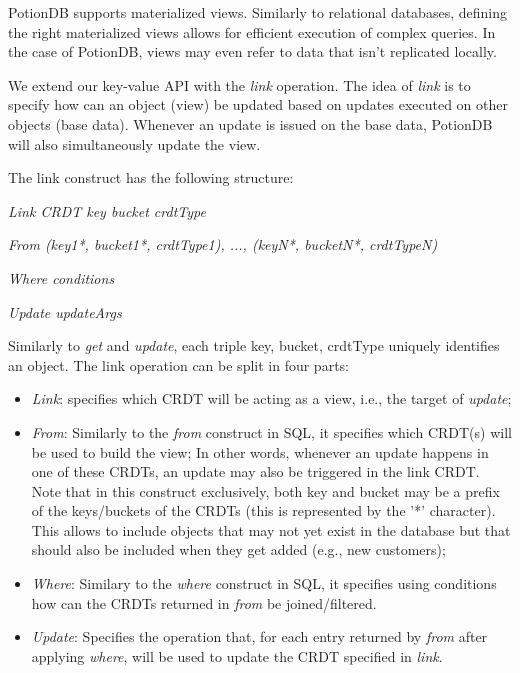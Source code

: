 \documentclass{vldb}
\newcommand{\emphvspace}{0.5\baselineskip}
\newcommand{\firstblockemph}[1]{\vspace{\emphvspace}\hspace{2em}\emph{#1}}
\newcommand{\middleblockemph}[1]{\hspace{2em}\emph{#1}}
\newcommand{\lastblockemph}[1]{\hspace{2em}\emph{#1}\vspace{\emphvspace}}
\begin{document}
PotionDB supports materialized views.
Similarly to relational databases, defining the right materialized views allows for efficient execution of complex queries.
In the case of PotionDB, views may even refer to data that isn't replicated locally.

We extend our key-value API with the \emph{link} operation.
The idea of \emph{link} is to specify how can an object (view) be updated based on updates executed on other objects (base data).
Whenever an update is issued on the base data, PotionDB will also simultaneously update the view.

The link construct has the following structure:

\firstblockemph{Link CRDT key bucket crdtType}

\middleblockemph{From (key1*, bucket1*, crdtType1), ..., (keyN*, bucketN*, crdtTypeN)}

\middleblockemph{Where conditions}

\lastblockemph{Update updateArgs}

Similarly to \emph{get} and \emph{update}, each triple key, bucket, crdtType uniquely identifies an object.
The link operation can be split in four parts:

\begin{itemize}
	\item \emph{Link}: specifies which CRDT will be acting as a view, i.e., the target of  \emph{update};
	\item \emph{From}: Similarly to the \emph{from} construct in SQL, it specifies which CRDT(s) will be used to build the view;
	In other words, whenever an update happens in one of these CRDTs, an update may also be triggered in the link CRDT.
	Note that in this construct exclusively, both key and bucket may be a prefix of the keys/buckets of the CRDTs (this is represented by the '*' character).
	This allows to include objects that may not yet exist in the database but that should also be included when they get added (e.g., new customers);
	\item \emph{Where}: Similary to the \emph{where} construct in SQL, it specifies using conditions how can the CRDTs returned in \emph{from} be joined/filtered. %
	\item \emph{Update}: Specifies the operation that, for each entry returned by \emph{from} after applying \emph{where}, will be used to update the CRDT specified in \emph{link}.
\end{itemize}
\end{document}
